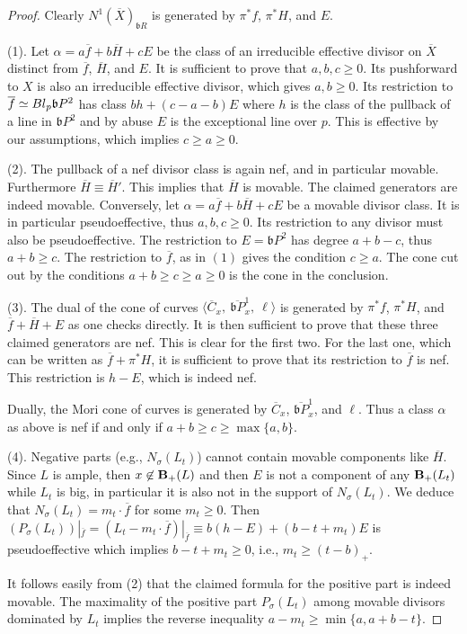 \documentclass[10pt,a4paper]{amsart}
\newcommand{\bb}{\ensuremath{\mathfrak{b}}}
\renewcommand{\geq}{\geqslant}
\begin{document}
\begin{proof} 
Clearly $N^1(\overline X)_{\bb R}$ is generated by $\pi^*f$, $\pi^*H$, and $E$.

(1). Let $\alpha=a\overline f+b\overline H+cE$ be the class of an irreducible effective divisor on $\overline X$ distinct from $\overline f$, $\overline H$, and $E$. It is sufficient to prove that $a,b,c\geq 0$. Its pushforward to $X$ is also an irreducible effective divisor, which gives $a,b\geq 0$.
Its restriction to $\overline f\simeq{\rm Bl}_p\bb P^2$ has class $bh+(c-a-b)E$ where $h$ is the class of the pullback of a line in $\bb P^2$ and by abuse $E$ is the exceptional line over $p$. This is effective by our assumptions, which implies $c\geq a\geq 0$.

(2). The pullback of a nef divisor class is again nef, and in particular movable. Furthermore $\overline H\equiv\overline H'$. This implies that $\overline H$ is movable. The claimed generators are indeed movable. Conversely, let $\alpha=a\overline f+b\overline H+cE$ be a movable divisor class. It is in particular pseudoeffective, thus $a,b,c\geq 0$. Its restriction to any divisor must also be pseudoeffective. 
The restriction to $E=\bb P^2$ has degree $a+b-c$, thus $a+b\geq c$.
The restriction to $\overline f$, as in $(1)$ gives the condition $c\geq a$.
The cone cut out by the conditions $a+b\geq c\geq a\geq 0$ is the cone in the conclusion. 

(3). The dual of the cone of curves $\langle\overline C_x,\ \overline{\bb P}^1_x,\ \ell\rangle$ is generated by  $\pi^*f$, $\pi^*H$, and $\overline f+\overline H+E$ as one checks directly. It is then sufficient to prove that these three claimed generators are nef. This is clear for the first two. For the last one, which can be written as $\overline f+\pi^*H$, it is sufficient to prove that its restriction to $\overline f$ is nef. This restriction is $h-E$, which is indeed nef. 

Dually, the Mori cone of curves is generated by $\overline C_x$, $\overline{\bb P}^1_x$, and $\ell$. Thus a class $\alpha$ as above is nef if and only if $a+b\geq c\geq\max\{a,b\}$.


(4). Negative parts (e.g., $N_{\sigma}(L_t)$) cannot contain movable components like $\overline H$. Since $L$ is ample, then $x\not\in{\bf B}_+(L)$ and then $E$ is not a component of any ${\bf B}_+(L_t)$ while $L_t$ is big, in particular it is also not in the support of $N_{\sigma}(L_t)$. We deduce that $N_{\sigma}(L_t)=m_t\cdot\overline f$ for some $m_t\geq 0$. 
Then $(P_{\sigma}(L_t))|_{\overline f}=(L_t-m_t\cdot\overline f)|_{\overline f}\equiv b(h-E)+(b-t+m_t)E$ is pseudoeffective which implies $b-t+m_t\geq 0$, i.e., $m_t\geq(t-b)_+$.

It follows easily from (2) that the claimed formula for the positive part is indeed movable. The maximality of the positive part $P_{\sigma}(L_t)$ among movable divisors dominated by $L_t$ implies the reverse inequality $a-m_t\geq\min\{a,a+b-t\}$.  
\end{proof} 
\end{document}

